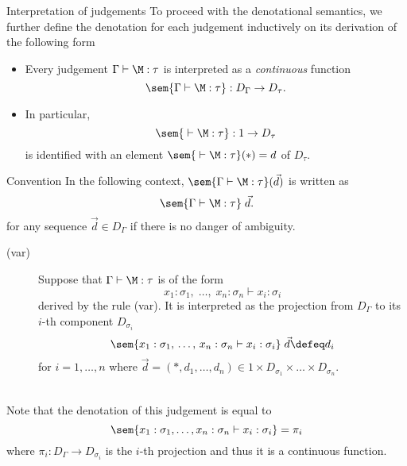 \begin{frame}{Interpretation of judgements}
  To proceed with the denotational semantics, we further define
  the denotation for each judgement inductively on its derivation
  of the following form
  \begin{itemize}
    \item Every judgement $\Gamma \vdash \M : \tau$ is interpreted as a
      \emph{continuous} function
      \[
        \sem{\Gamma \vdash \M : \tau} : D_\Gamma \to D_{\tau}.
      \] 
    \item In particular, 
      \[
        \sem{ {} \vdash \M : \tau} : 1 \to D_\tau
      \]
      is identified 
      with an element $\sem{{}\vdash \M : \tau}(*) = d$ of $D_\tau$.
  \end{itemize}
  \begin{block}{Convention}
    In the following context, $\sem{\Gamma \vdash \M : \tau}(\vec{d})$
    is written as
    \[
      \sem{\Gamma \vdash \M : \tau}\;\vec{d}.
    \]
    for any sequence $\vec{d} \in D_\Gamma$ if there is no danger of ambiguity. 
  \end{block}
\end{frame}
\begin{frame}
  \begin{description}
    \item[(var)] 
      Suppose that $\Gamma \vdash \M : \tau$ is of the form
      \[
        x_1 : \sigma_1,\;\ldots,\; x_n : \sigma_n \vdash x_i : \sigma_i
      \]
      derived by the rule (var).  It is interpreted as the projection
      from $D_\Gamma$ to its $i$-th component $D_{\sigma_i}$
      \[
        \sem{x_1 : \sigma_1,\, \ldots,\, x_n : \sigma_n
          \vdash x_i : \sigma_i}\;\vec{d}  \defeq d_i
      \]
      for $i = 1,\ldots,n$ where $\vec{d} = (*, d_1, \ldots, d_n) \in
      1 \times D_{\sigma_1}
      \times \dots \times D_{\sigma_n}$.
  \end{description}
  ~\\
  Note that the denotation of this judgement is equal to 
  \[
    \sem{x_1 : \sigma_1, \ldots, x_n:\sigma_n \vdash x_i:\sigma_i}
    = \pi_i 
  \]
  where $\pi_i \colon D_\Gamma \to D_{\sigma_i}$ is the $i$-th projection
  and thus it is a continuous function. 

\end{frame}

